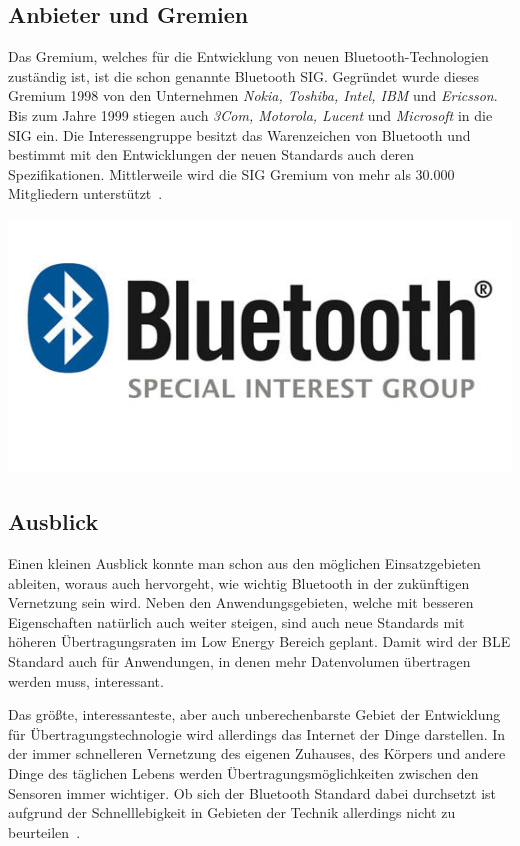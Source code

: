 \begin{multicols}{3}
\subsection*{Anbieter und Gremien}
Das Gremium, welches für die Entwicklung von neuen Bluetooth-Technologien zuständig ist, ist die schon genannte Bluetooth SIG. Gegründet wurde dieses Gremium 1998 von den Unternehmen \textit{Nokia, Toshiba, Intel, IBM} und \textit{Ericsson}. Bis zum Jahre 1999 stiegen auch \textit{3Com, Motorola, Lucent} und \textit{Microsoft} in die SIG ein. Die Interessengruppe besitzt das Warenzeichen von Bluetooth und bestimmt mit den Entwicklungen der neuen Standards auch deren Spezifikationen. Mittlerweile wird die SIG Gremium von mehr als 30.000 Mitgliedern unterstützt~\cite{BLE.1}.
\begin{Figure}
\includegraphics[width=\linewidth]{Kapitel/BLE/Grafiken/BluetoothSIGLogo.jpg}
\end{Figure}
\subsection*{Ausblick}
Einen kleinen Ausblick konnte man schon aus den möglichen Einsatzgebieten ableiten, woraus auch hervorgeht, wie wichtig Bluetooth in der zukünftigen Vernetzung sein wird. Neben den Anwendungsgebieten, welche mit besseren Eigenschaften natürlich auch weiter steigen, sind auch neue Standards mit höheren Übertragungsraten im Low Energy Bereich geplant. Damit wird der BLE Standard auch für Anwendungen, in denen mehr Datenvolumen übertragen werden muss, interessant.

Das größte, interessanteste, aber auch unberechenbarste Gebiet der Entwicklung für Übertragungstechnologie wird allerdings das Internet der Dinge darstellen. In der immer schnelleren Vernetzung des eigenen Zuhauses, des Körpers und andere Dinge des täglichen Lebens werden Übertragungsmöglichkeiten zwischen den Sensoren immer wichtiger. Ob sich der Bluetooth Standard dabei durchsetzt ist aufgrund der Schnelllebigkeit in Gebieten der Technik allerdings nicht zu beurteilen~\cite{BLE.1}.

\printbibliography[segment=13,heading=subbibliography]
\end{multicols}

\newpage
